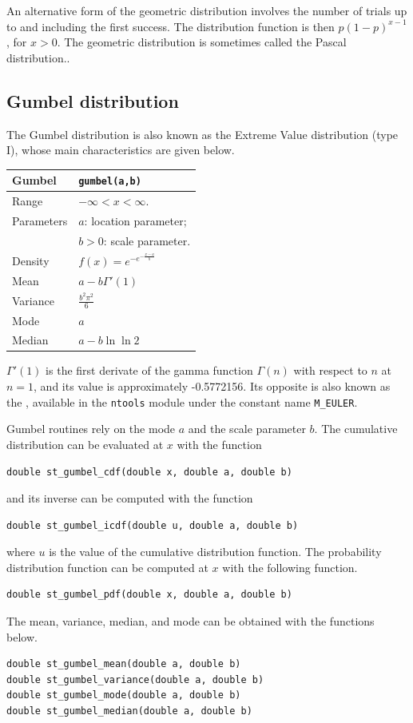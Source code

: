 An alternative form of the geometric distribution involves the number of trials up to and including the first success.
The distribution function is then $p(1-p)^{x-1}$, for $x > 0$.
The geometric distribution is sometimes called the Pascal distribution..

\subsection{Gumbel distribution}

The Gumbel distribution is also known as the Extreme Value
distribution (type I), whose main characteristics are given below.

\mbox{}

\noindent
\begin{tabularx}{\textwidth}{lX}
Gumbel & \verb|gumbel(a,b)|\\
\hline
Range & $-\infty < x < \infty$.\\
Parameters & $a$: location parameter; \\
& $b > 0$: scale parameter. \\
Density & $f(x) = e^{-e^{-\frac{x-a}{b}}}$ \\
Mean & $a-b\Gamma' (1)$ \\
Variance & $\frac{b^2\pi^2}{6}$ \\
Mode & $a$ \\
Median & $a - b \ln \ln 2$ \\
\hline
\end{tabularx}

\mbox{}

$\Gamma'(1)$ is the first derivate of the gamma function $\Gamma(n)$
with respect to $n$ at $n = 1$, and its value is approximately
-0.5772156. Its opposite is also known as the
, available in the \verb|ntools| module under the
constant name \verb|M_EULER|.

Gumbel routines rely on the mode $a$ and the scale parameter $b$.
The cumulative distribution can be evaluated at $x$ with the function
\begin{verbatim}
double st_gumbel_cdf(double x, double a, double b)
\end{verbatim}
and its inverse can be computed with the function
\begin{verbatim}
double st_gumbel_icdf(double u, double a, double b)
\end{verbatim}
where $u$ is the value of the cumulative distribution function.
The probability distribution function can be computed at $x$ with the
following function.
\begin{verbatim}
double st_gumbel_pdf(double x, double a, double b)
\end{verbatim}
The mean, variance, median, and mode can be obtained with the functions below.
\begin{verbatim}
double st_gumbel_mean(double a, double b)
double st_gumbel_variance(double a, double b)
double st_gumbel_mode(double a, double b)
double st_gumbel_median(double a, double b)
\end{verbatim}

